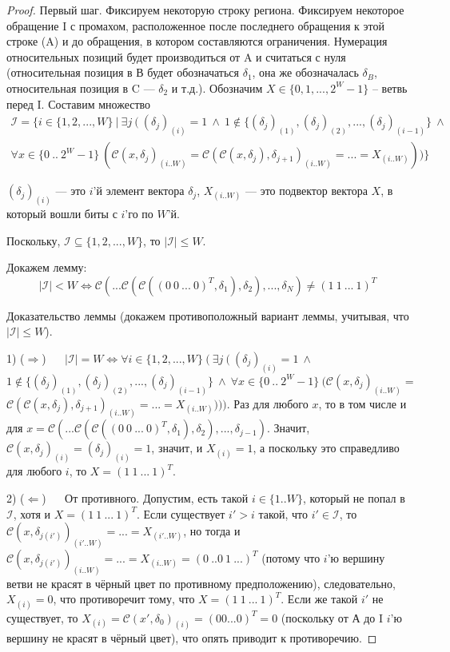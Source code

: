 \begin{proof}
  Первый шаг. Фиксируем некоторую строку региона. Фиксируем некоторое обращение I с промахом, расположенное после последнего обращения к этой строке (A) и до обращения, в котором составляются ограничения. Нумерация относительных позиций будет производиться от A и считаться с нуля (относительная позиция в В будет обозначаться $\delta_1$, она же обозначалась $\delta_B$, относительная позиция в C --- $\delta_2$ и т.д.). Обозначим $X \in \{0, 1, ..., 2^W-1\}$ -- ветвь перед I. Составим множество
  $$\begin{array}{c}\mathcal{I} = \{i \in \{1, 2, ..., W\} ~|~ \exists j ~(~ (\delta_j)_{(i)} = 1 ~\wedge~
   1 \notin \{ (\delta_j)_{(1)}, (\delta_j)_{(2)}, ..., (\delta_j)_{(i-1)} \} ~\wedge~\\
   \forall x \in \{0~..~2^W{-}1\}~(  \mathcal{C}(x, \delta_j)_{(i..W)} = \mathcal{C}(\mathcal{C}(x, \delta_j), \delta_{j+1})_{(i..W)} = ... = X_{(i..W)}) ) \}\end{array}$$

   $(\delta_j)_{(i)}$ --- это $i$'й элемент вектора $\delta_j$, $X_{(i..W)}$ --- это подвектор вектора $X$, в который вошли биты с $i$'го по $W$'й.

   Поскольку, $\mathcal{I} \subseteq \{1, 2, ..., W\}$, то $|\mathcal{I}| \leqslant W$.

   Докажем лемму: $$|\mathcal{I}| < W \Leftrightarrow \mathcal{C}( ...  \mathcal{C}(  \mathcal{C}( (0~0~...~0)^T, \delta_1), \delta_2), ..., \delta_N) \neq (1~1~...~1)^T$$

   Доказательство леммы (докажем противоположный вариант леммы, учитывая, что $|\mathcal{I}| \leqslant W$).

   1) ($\Rightarrow$) ~~ $|\mathcal{I}| = W \Leftrightarrow \forall i \in \{1, 2, ..., W\} ~(~ \exists j ~(~ (\delta_j)_{(i)} = 1 ~\wedge~$ \\ $1 \notin \{ (\delta_j)_{(1)}, (\delta_j)_{(2)}, ..., (\delta_j)_{(i-1)} \} ~\wedge~
   \forall x \in \{0~..~2^W{-}1\}~(  \mathcal{C}(x, \delta_j)_{(i..W)} =$\\
    $\mathcal{C}(\mathcal{C}(x, \delta_j), \delta_{j+1})_{(i..W)} = ... = X_{(i..W)}) ) )$. Раз для любого $x$, то в том числе и для $x = \mathcal{C}( ...  \mathcal{C}(  \mathcal{C}( (0~0~...~0)^T, \delta_1), \delta_2), ..., \delta_{j-1})$. Значит, $\mathcal{C}(x, \delta_j)_{(i)} = (\delta_j)_{(i)} = 1$, значит, и $X_{(i)} = 1$, а поскольку это справедливо для любого $i$, то $X = (1~1~...~1)^T$.

   2) ($\Leftarrow$) ~~  От противного. Допустим, есть такой $i \in \{1..W\}$, который не попал в $\mathcal{I}$, хотя и $X = (1~1~...~1)^T$. Если существует $i' > i$ такой, что $i' \in \mathcal{I}$, то $\mathcal{C}(x, \delta_{j(i')})_{(i'..W)} = ... = X_{(i'..W)}$, но тогда и  $\mathcal{C}(x, \delta_{j(i')})_{(i..W)} = ... = X_{(i..W)} = (0~..0~1~...)^T$ (потому что $i$'ю вершину ветви не красят в чёрный цвет по противному предположению), следовательно, $X_{(i)} = 0$, что противоречит тому, что $X = (1~1~...~1)^T$. Если же такой $i'$ не существует, то $X_{(i)} = \mathcal{C}(x', \delta_0)_{(i)} = (0 0 ... 0)^T = 0$ (поскольку от А до I $i$'ю вершину не красят в чёрный цвет), что опять приводит к противоречию.


\end{proof}
